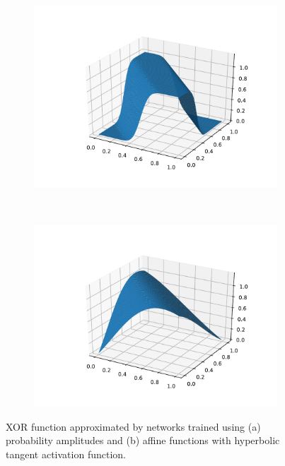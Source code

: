 \documentclass{article}
\begin{document}
\begin{figure}[t!]
  \centering
  \begin{subfigure}[t]{0.5\textwidth}
    \includegraphics[trim={1cm 1cm 1cm 1cm},width=\textwidth,clip]{xor_panet}
    \caption{}
  \end{subfigure}%
  ~
  \begin{subfigure}[t]{0.5\textwidth}
    \includegraphics[trim={1cm 1cm 1cm 1cm},width=\textwidth,clip]{xor_affine_tanh}
    \caption{}
  \end{subfigure}
  \caption{XOR function approximated by networks trained using (a)
    probability amplitudes and (b) affine functions with hyperbolic tangent
    activation function.}
  \label{fig:xor}
\end{figure}
\end{document}
